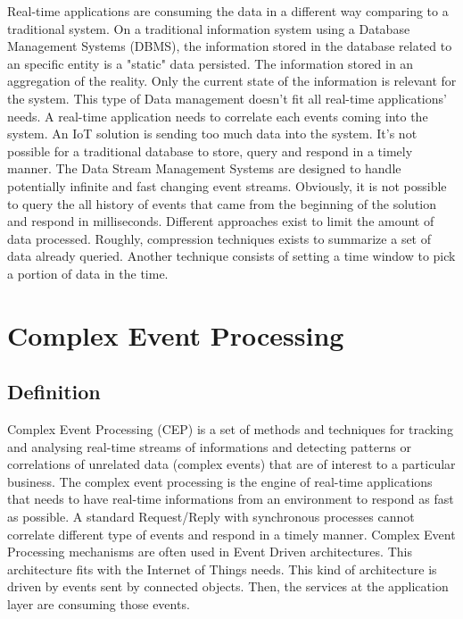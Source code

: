 \documentclass[11pt]{article}
\begin{document}
Real-time applications are consuming the data in a different way comparing to a traditional system. On a traditional information system using a Database Management Systems (DBMS), the information stored in the database related to an specific entity is a "static" data persisted. The information stored in an aggregation of the reality. Only the current state of the information is relevant for the system. This type of Data management doesn't fit all real-time applications' needs. A real-time application needs to correlate each events coming into the system. An IoT solution is sending too much data into the system. It's not possible for a traditional database to store, query and respond in a timely manner. 
\newline
\newline
The Data Stream Management Systems are designed to handle potentially infinite and fast changing event streams. Obviously, it is not possible to query the all history of events that came from the beginning of the solution and respond in milliseconds. Different approaches exist to limit the amount of data processed. Roughly, compression techniques exists to summarize a set of data already queried. Another technique consists of setting a time window to pick a portion of data in the time. 

\section{Complex Event Processing}

\subsection{Definition}

Complex Event Processing (CEP) is a set of methods and techniques for tracking
and analysing real-time streams of informations and detecting patterns or correlations
of unrelated data (complex events) that are of interest to a particular
business. \cite{1} The complex event processing is the engine of real-time applications that needs to have real-time informations from an environment to respond as fast as possible. A standard Request/Reply with synchronous processes cannot correlate different type of events and respond in a timely manner. Complex Event Processing mechanisms are often used in Event Driven architectures. This architecture fits with the Internet of Things needs. This kind of architecture is driven by events sent by connected objects. Then, the services at the application layer are consuming those events.
\end{document}
